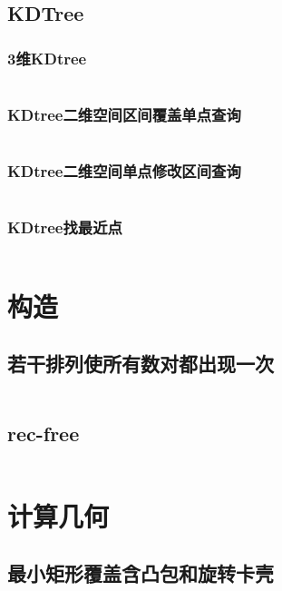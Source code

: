 \documentclass[a4paper,11pt]{article}
\begin{document}
\subsection{KDTree}
\subsubsection{3维KDtree}
\inputminted[breaklines]{c++}{数据结构/3维KDtree.cpp}

\subsubsection{KDtree二维空间区间覆盖单点查询}
\inputminted[breaklines]{c++}{数据结构/KDtree二维空间区间覆盖单点查询.cpp}

\subsubsection{KDtree二维空间单点修改区间查询}
\inputminted[breaklines]{c++}{数据结构/KDtree二维空间单点修改区间查询.cpp}

\subsubsection{KDtree找最近点}
\inputminted[breaklines]{c++}{数据结构/KDtree找最近点.cpp}

\twocolumn  %
\newpage
\section{构造}
\subsection{若干排列使所有数对都出现一次}
\inputminted[breaklines]{c++}{构造/若干排列使所有数对都出现一次.cpp}

\subsection{rec-free}
\inputminted[breaklines]{c++}{构造/rec-free.cpp}

\twocolumn  %
\newpage
\section{计算几何}
\subsection{最小矩形覆盖含凸包和旋转卡壳}
\inputminted[breaklines]{c++}{计算几何/最小矩形覆盖含凸包和旋转卡壳.cpp}
\end{document}
